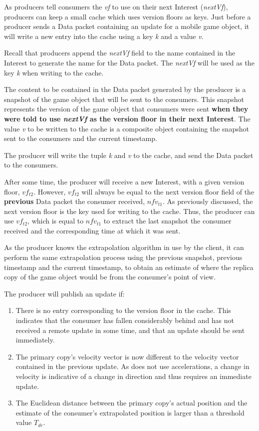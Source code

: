 As producers tell consumers the \textit{vf} to use on their next Interest (\textit{nextVf}), producers can keep a small cache which uses version floors as keys. Just before a producer sends a Data packet containing an update for a mobile game object, it will write a new entry into the cache using a key \textit{k} and a value \textit{v}. 

Recall that producers append the \textit{nextVf} field to the name contained in the Interest to generate the name for the Data packet. The \textit{nextVf} will be used as the key \textit{k} when writing to the cache.

The content to be contained in the Data packet generated by the producer is a snapshot of the game object that will be sent to the consumers. This snapshot represents the version of the game object that consumers were sent \textbf{when they were told to use \textit{nextVf} as the version floor in their next Interest}. The value \textit{v} to be written to the cache is a composite object containing the snapshot sent to the consumers and the current timestamp. 

The producer will write the tuple \textit{k} and \textit{v} to the cache, and send the Data packet to the consumers. 

After some time, the producer will receive a new Interest, with a given version floor, $vf_{t2}$. However, $vf_{t2}$ will always be equal to the next version floor field of the \textbf{previous} Data packet the consumer received, $nfv_{t1}$. As previously discussed, the next version floor is the key used for writing to the cache. Thus, the producer can use $vf_{t2}$, which is equal to $nfv_{t1}$ to extract the last snapshot the consumer received and the corresponding time at which it was sent. 

As the producer knows the extrapolation algorithm in use by the client, it can perform the same extrapolation process using the previous snapshot, previous timestamp and the current timestamp, to obtain an estimate of where the replica copy of the game object would be from the consumer's point of view. 

The producer will publish an update if:


\begin{enumerate}
    \item There is no entry corresponding to the version floor in the cache. This indicates that the consumer has fallen considerably behind and has not received a remote update in some time, and that an update should be sent immediately. 
    \item The primary copy's velocity vector is now different to the velocity vector contained in the previous update. As \game{} does not use accelerations, a change in velocity is indicative of a change in direction and thus requires an immediate update.
    \item The Euclidean distance between the primary copy's actual position and the estimate of the consumer's extrapolated position is larger than a threshold value $T_{dr}$. 
\end{enumerate}


